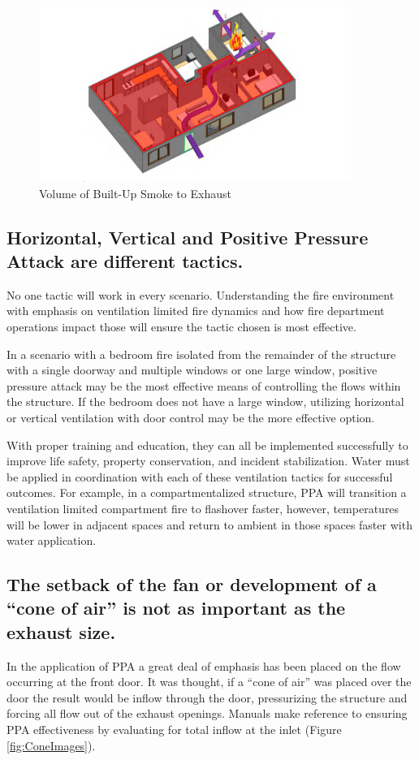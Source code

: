 \documentclass{article}
\begin{document}
\begin{figure}[H]
	\centering
	\includegraphics[width = 4in ]{0_Images/Tactical_Considerations/Understanding_Basics/SmokeToBeExhausted.pdf}
	\caption{Volume of Built-Up Smoke to Exhaust}
	\label{fig:SmokeToExhaust}
\end{figure}

\subsection{Horizontal, Vertical and Positive Pressure Attack are different tactics.} 
No one tactic will work in every scenario. Understanding the fire environment with emphasis on ventilation limited fire dynamics and how fire department operations impact those will ensure the tactic chosen is most effective.

In a scenario with a bedroom fire isolated from the remainder of the structure with a single doorway and multiple windows or one large window, positive pressure attack may be the most effective means of controlling the flows within the structure. If the bedroom does not have a large window, utilizing horizontal or vertical ventilation with door control may be the more effective option. 

With proper training and education, they can all be implemented successfully to improve life safety, property conservation, and incident stabilization.  Water must be applied in coordination with each of these ventilation tactics for successful outcomes.   For example, in a compartmentalized structure, PPA will transition a ventilation limited compartment fire to flashover faster, however, temperatures will be lower in adjacent spaces and return to ambient in those spaces faster with water application.

\subsection{The setback of the fan or development of a “cone of air” is not as important as the exhaust size.}
In the application of PPA a great deal of emphasis has been placed on the flow occurring at the front door. It was thought, if a ``cone of air'' was placed over the door the result would be inflow through the door, pressurizing the structure and forcing all flow out of the exhaust openings. Manuals make reference to ensuring PPA effectiveness by evaluating for total inflow at the inlet (Figure \ref{fig:ConeImages}).
\end{document}
